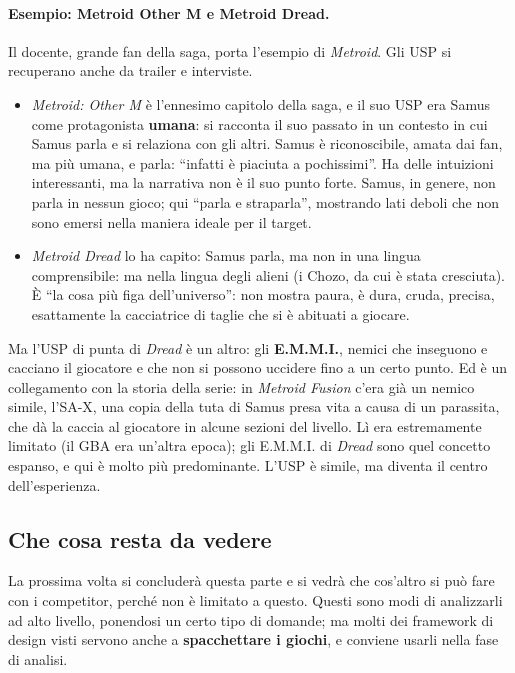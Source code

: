 \paragraph{Esempio: Metroid Other M e Metroid Dread.} Il docente, grande fan
della saga, porta l'esempio di \emph{Metroid}. Gli USP si recuperano anche da
trailer e interviste.
\begin{itemize}
  \item \emph{Metroid: Other M} è l'ennesimo capitolo della saga, e il suo USP
        era Samus come protagonista \textbf{umana}: si racconta il suo
        passato in un contesto in cui Samus parla e si relaziona con gli
        altri. Samus è riconoscibile, amata dai fan, ma più umana, e parla:
        ``infatti è piaciuta a pochissimi''. Ha delle intuizioni interessanti,
        ma la narrativa non è il suo punto forte. Samus, in genere, non parla
        in nessun gioco; qui ``parla e straparla'', mostrando lati deboli che
        non sono emersi nella maniera ideale per il target.
  \item \emph{Metroid Dread} lo ha capito: Samus parla, ma non in una lingua
        comprensibile: ma nella lingua degli alieni (i Chozo, da
        cui è stata cresciuta). È ``la cosa più figa dell'universo'': non
        mostra paura, è dura, cruda, precisa, esattamente la cacciatrice di
        taglie che si è abituati a giocare.
\end{itemize}
Ma l'USP di punta di \emph{Dread} è un altro: gli \textbf{E.M.M.I.}, nemici
che inseguono e cacciano il giocatore e che non si possono uccidere fino a un
certo punto. Ed è un collegamento con la storia della serie: in
\emph{Metroid Fusion} c'era già un nemico simile, l'SA-X, una copia della
tuta di Samus presa vita a causa di un parassita, che dà la caccia al
giocatore in alcune sezioni del livello. Lì era estremamente limitato (il GBA
era un'altra epoca); gli E.M.M.I. di \emph{Dread} sono quel concetto espanso,
e qui è molto più predominante. L'USP è simile, ma diventa il centro
dell'esperienza.

\subsection{Che cosa resta da vedere}

La prossima volta si concluderà questa parte e si vedrà che cos'altro si può
fare con i competitor, perché non è limitato a questo. Questi sono modi di
analizzarli ad alto livello, ponendosi un certo tipo di domande; ma molti dei
framework di design visti servono anche a \textbf{spacchettare i giochi}, e
conviene usarli nella fase di analisi.

